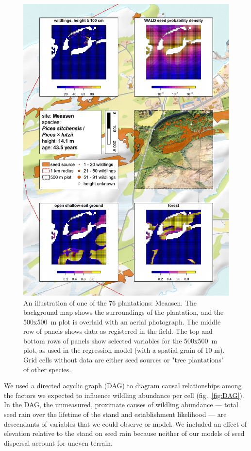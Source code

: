 \documentclass[
]{article}
\begin{document}
\begin{figure}
\includegraphics[width=0.9\linewidth]{figures/site-example/site-example} \caption{An illustration of one of the 76 plantations: Meaasen. The background map shows the surroundings of the plantation, and the 500x500 m plot is overlaid with an aerial photograph. The middle row of panels shows data as registered in the field. The top and bottom rows of panels show selected variables for the 500x500 m plot, as used in the regression model (with a spatial grain of 10 m). Grid cells without data are either seed sources or "tree plantations" of other species.}\label{fig:site-example}
\end{figure}

We used a directed acyclic graph (DAG) to diagram causal relationships among the
factors we expected to influence wildling abundance per cell
(fig.~\ref{fig:DAG}). In the DAG, the unmeasured, proximate causes of wildling
abundance --- total seed rain over the lifetime of the stand and establishment
likelihood --- are descendants of variables that we could observe or model. We
included an effect of elevation relative to the stand on seed rain because
neither of our models of seed dispersal account for uneven terrain.
\end{document}
